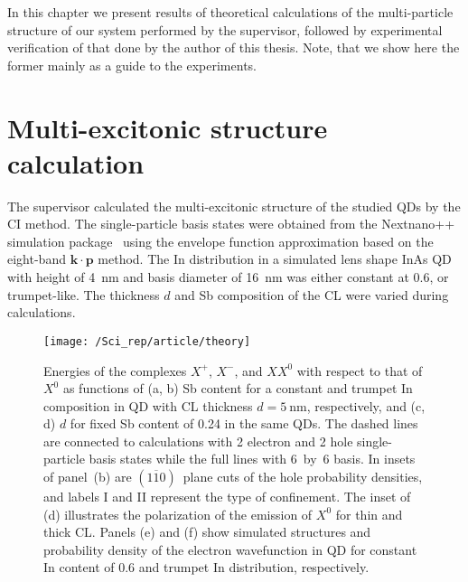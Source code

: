 \medskip
In this chapter we present results of theoretical calculations of the multi-particle structure of our system performed by the supervisor, followed by experimental verification of that done by the author of this thesis. Note, that we show here the former mainly as a guide to the experiments.
\newpage 




\section{Multi-excitonic structure calculation} \label{sec:scirep_theory}
The supervisor calculated the multi-excitonic structure of the studied QDs by the CI method. The single-particle basis states were obtained from the Nextnano++ simulation package~\citep{next} using the envelope function approximation based on the eight-band $\mathbf{k \cdot p}$ method. The In distribution in a simulated lens shape InAs QD with height of 4~nm and basis diameter of 16~nm was either constant at 0.6, or trumpet-like. The thickness $d$ and Sb composition of the CL were varied during calculations. 
%
\begin{figure}
	\centering
	\texttt{[image: /Sci\_rep/article/theory]}
	\caption{Energies of the complexes $X^+$, $X^-$, and $XX^0$ with respect to that of $X^0$ as functions of (a, b) Sb content for a constant and trumpet In composition in QD with CL thickness $d=5~\mathrm{nm}$, respectively, and (c, d) $d$ for fixed Sb content of 0.24 in the same QDs. The dashed lines are connected to calculations with 2 electron and 2 hole single-particle basis states while the full lines with 6~by~6 basis. In insets of panel~(b) are $(1\overline{1}0)$~plane cuts of the hole probability densities, and labels I and II represent the type of confinement. The inset of (d) illustrates the polarization of the emission of $X^0$ for thin and thick CL. Panels (e) and (f) show simulated structures and probability density of the electron wavefunction in QD for constant In content of 0.6 and trumpet In distribution, respectively.}
	\label{fig:Sci_rep_theory}
\end{figure}
%

